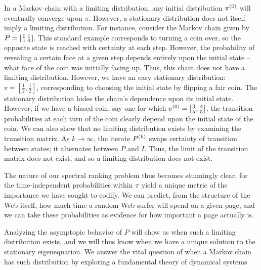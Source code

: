 \documentclass[../exploring-pagerank.tex]{subfiles}
\begin{document}
	In a Markov chain with a limiting distribution, any initial distribution $\pi^{(0)}$ will eventually converge upon $\pi$. However, a stationary distribution does not itself imply a limiting distribution. For instance, consider the Markov chain given by $P=\begin{bsmallmatrix} 0 & 1 \\ 1 & 0 \end{bsmallmatrix}$. This standard example corresponds to turning a coin over, so the opposite state is reached with certainty at each step. However, the probability of revealing a certain face at a given step depends entirely upon the initial state -- what face of the coin was initially facing up. Thus, this chain does not have a limiting distribution. However, we have an easy stationary distribution: $v = [\frac{1}{2}, \frac{1}{2}]$, corresponding to choosing the initial state by flipping a fair coin. The stationary distribution hides the chain's dependence upon its initial state. However, if we have a biased coin, say one for which $v^{(0)} = [\frac{3}{5}, \frac{4}{5}]$, the transition probabilities at each turn of the coin clearly depend upon the initial state of the coin. We can also show that no limiting distribution exists by examining the transition matrix. As $k\to\infty$, the iterate $P^{(k)}$ swaps certainty of transition between states; it alternates between $P$ and $I$. Thus, the limit of the transition matrix does not exist, and so a limiting distribution does not exist.
	
    The nature of our spectral ranking problem thus becomes stunningly clear, for the time-independent probabilities within $\pi$ yield a unique metric of the importance we have sought to codify. We can predict, from the structure of the Web itself, how much time a random Web surfer will spend on a given page, and we can take these probabilities as evidence for how important a page actually is. 
    
    Analyzing the asymptopic behavior of $P$ will show us when such a limiting distribution exists, and we will thus know when we have a unique solution to the stationary eigenequation. We answer the vital question of when a Markov chain has such distribution by exploring a fundamental theory of dynamical systems.
\end{document}
